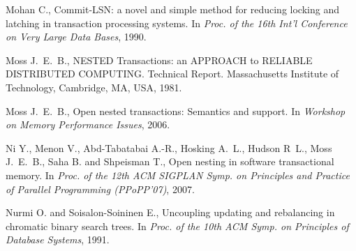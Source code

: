 \begin{thebibliography}{99}
{
Mohan C.,
\newblock Commit-{LSN}: a novel and simple method for reducing locking and
  latching in transaction processing systems.
\newblock In {\em Proc. of the 16th Int'l Conference on Very Large Data Bases},
  1990.




Moss J.~E.~B.,
\newblock NESTED Transactions: an APPROACH to RELIABLE DISTRIBUTED COMPUTING.
\newblock Technical Report. Massachusetts Institute of Technology, Cambridge, MA, USA, 1981.

Moss J.~E.~B.,
\newblock Open nested transactions: Semantics and support.
\newblock In {\em Workshop on Memory Performance Issues}, 2006.





Ni Y., Menon V., Abd-Tabatabai A.-R., Hosking A.~L.,
  Hudson R~L., Moss J.~E.~B., Saha B. and Shpeisman T.,
\newblock Open nesting in software transactional memory.
\newblock In {\em Proc. of the 12th ACM SIGPLAN Symp. on Principles and
  Practice of Parallel Programming (PPoPP'07)}, 2007.


% 


Nurmi O. and Soisalon-Soininen E.,
\newblock Uncoupling updating and rebalancing in chromatic binary search trees.
\newblock In {\em Proc. of the 10th ACM Symp. on Principles of Database
  Systems}, 1991.

}
\end{thebibliography}
